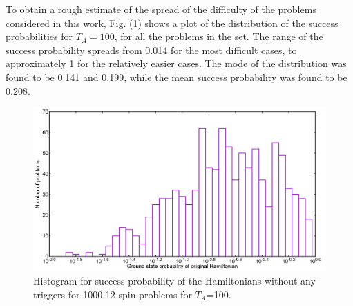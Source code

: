 \documentclass[../main.tex]{subfiles}
\begin{document}

To obtain a rough estimate of the spread of the difficulty of the problems considered in this work, Fig. (\ref{fig:o8}) shows a plot of the distribution of the success probabilities for $T_A=100$, for all the problems in the set. The range of the success probability spreads from 0.014 for the most difficult cases, to approximately 1 for the relatively easier cases. The mode of the distribution was found to be 0.141 and 0.199, while the mean success probability was found to be 0.208. 
\begin{figure}[H]
\centering 
\includegraphics[scale=0.24]{O_s12_T100_g0.png}
\caption{Histogram for success probability of the Hamiltonians without any triggers for 1000 12-spin problems for $T_A$=100.}
\label{fig:o8}
\end{figure}
\end{document}
